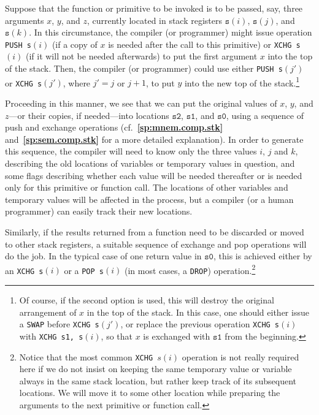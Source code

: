 \documentclass[12pt,oneside]{article}
\def\refpoint#1{{\rm\textbf{\ref{#1}}}}
\let\ptref=\refpoint
\begin{document}
    Suppose that the function or primitive to be invoked is to be passed, say, three arguments $x$, $y$, and $z$, currently located in stack registers $\texttt{s}(i)$, $\texttt{s}(j)$, and $\texttt{s}(k)$. In this circumstance, the compiler (or programmer) might issue operation \texttt{PUSH s$(i)$} (if a copy of $x$ is needed after the call to this primitive) or \texttt{XCHG s$(i)$} (if it will not be needed afterwards) to put the first argument $x$ into the top of the stack. Then, the compiler (or programmer) could use either \texttt{PUSH s$(j')$} or \texttt{XCHG s$(j')$}, where $j'=j$ or $j+1$, to put $y$ into the new top of the stack.\footnote{Of course, if the second option is used, this will destroy the original arrangement of $x$ in the top of the stack. In this case, one should either issue a \texttt{SWAP} before \texttt{XCHG s$(j')$}, or replace the previous operation \texttt{XCHG s$(i)$} with \texttt{XCHG s1, s$(i)$}, so that $x$ is exchanged with $\texttt{s1}$ from the beginning.}

    Proceeding in this manner, we see that we can put the original values of $x$, $y$, and $z$---or their copies, if needed---into locations $\texttt{s2}$, $\texttt{s1}$, and $\texttt{s0}$, using a sequence of push and exchange operations (cf.~\ptref{sp:mnem.comp.stk} and~\ptref{sp:sem.comp.stk} for a more detailed explanation). In order to generate this sequence, the compiler will need to know only the three values $i$, $j$ and $k$, describing the old locations of variables or temporary values in question, and some flags describing whether each value will be needed thereafter or is needed only for this primitive or function call. The locations of other variables and temporary values will be affected in the process, but a compiler (or a human programmer) can easily track their new locations.

    Similarly, if the results returned from a function need to be discarded or moved to other stack registers, a suitable sequence of exchange and pop operations will do the job. In the typical case of one return value in $\texttt{s0}$, this is achieved either by an \texttt{XCHG s$(i)$} or a \texttt{POP s$(i)$} (in most cases, a \texttt{DROP}) operation.\footnote{Notice that the most common \texttt{XCHG $s(i)$} operation is not really required here if we do not insist on keeping the same temporary value or variable always in the same stack location, but rather keep track of its subsequent locations. We will move it to some other location while preparing the arguments to the next primitive or function call.}
\end{document}
